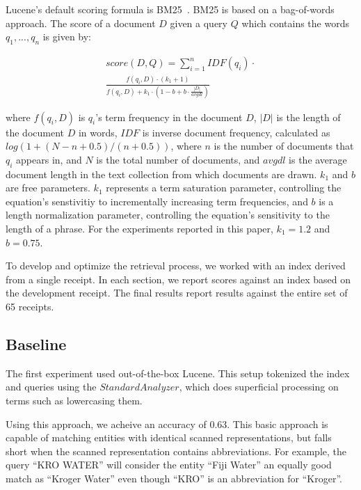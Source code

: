 \documentclass[11pt,a4paper]{article}
\begin{document}
Lucene's default scoring formula is
BM25~\cite{robertson:2009}.  BM25 is based on a
bag-of-words approach. The score of a document $D$ given a query $Q$
which contains the words $q_1, ..., q_n$ is given by: 

\begin{equation}
\begin{split}
  \label{eq:bm25}
score(D,Q) = \sum_{i=1}^{n} IDF(q_i) \cdot \\
  \frac{f(q_i, D) \cdot (k_1 + 1)}{f(q_i, D) + k_1 \cdot (1 - b + b
    \cdot \frac{|D|}{avgdl})}
\end{split}
\end{equation}

where $f(q_i, D)$ is $q_i$'s term frequency in the document $D$, $|D|$
is the length of the document $D$ in words,
$IDF$ is inverse document frequency, calculated as $log(1 + (N - n + 0.5) / (n + 0.5))$, 
where $n$ is the number of documents that $q_i$ appears in, and $N$
is the total number of documents,
and $avgdl$ is the average
document length in the text collection from which documents are
drawn. $k_1$ and $b$ are free parameters.  $k_1$ represents a term
saturation parameter, controlling the equation's senstivitiy to
incrementally increasing term frequencies, and $b$ is a length
normalization parameter, controlling the equation's sensitivity
to the length of a phrase.  For the experiments reported in this
paper, $k_1 = 1.2$ and $b = 0.75$.

To develop and optimize the retrieval process, we worked with an index
derived from a single receipt.
In each section, we report scores against an index based on the
development receipt.  The final results report results against
the entire set of 65 receipts.

\subsection{Baseline}

The first experiment used out-of-the-box Lucene.  This setup tokenized
the index and queries using the $StandardAnalyzer$, which does
superficial processing on terms such as lowercasing them.

Using this approach, we acheive an accuracy of 0.63.
This basic approach is capable of matching entities with identical
scanned representations, but falls short when the scanned
representation contains abbreviations.  For example, the
query ``KRO WATER'' will consider the entity ``Fiji Water''
an equally good match as ``Kroger Water'' even though ``KRO''
is an abbreviation for ``Kroger''.
\end{document}

